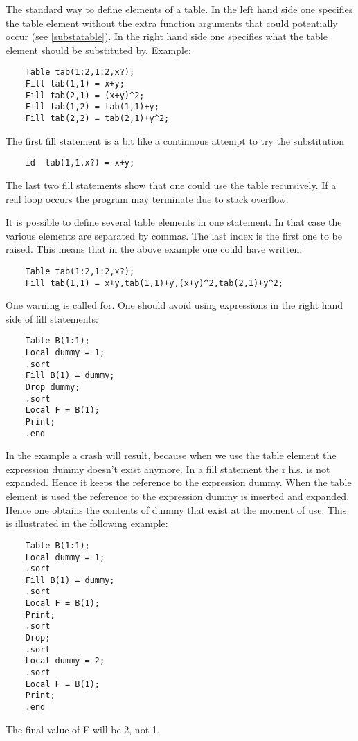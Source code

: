 \noindent The standard way to define elements of a 
table. In the left hand 
side one specifies the table element without the extra function arguments 
that could potentially occur (see \ref{substatable}). In the right hand 
side one specifies what the table element should be substituted by. 
Example:
\begin{verbatim}
    Table tab(1:2,1:2,x?);
    Fill tab(1,1) = x+y;
    Fill tab(2,1) = (x+y)^2;
    Fill tab(1,2) = tab(1,1)+y;
    Fill tab(2,2) = tab(2,1)+y^2;
\end{verbatim}
The first fill statement is a bit like a continuous attempt to try the 
substitution
\begin{verbatim}
    id  tab(1,1,x?) = x+y;
\end{verbatim}
The last two fill statements show that one could use the table 
recursively. 
If a real loop occurs the program may terminate due to
stack overflow.

\noindent It is possible to define several table elements in one statement. 
In that case the various elements are separated by commas. The last index 
is the first one to be raised. This means that in the above example one 
could have written:
\begin{verbatim}
    Table tab(1:2,1:2,x?);
    Fill tab(1,1) = x+y,tab(1,1)+y,(x+y)^2,tab(2,1)+y^2;
\end{verbatim}\vspace{10mm}

\noindent One warning is called for. One should avoid using 
expressions in the right hand side of fill statements:
\begin{verbatim}
    Table B(1:1);
    Local dummy = 1;
    .sort
    Fill B(1) = dummy;
    Drop dummy;
    .sort
    Local F = B(1);
    Print;
    .end
\end{verbatim}
In the example a crash will result, because when we use the table element 
the expression dummy doesn't exist anymore. In a fill statement the r.h.s. 
is not expanded. Hence it keeps the reference to the expression dummy. When 
the table element is used the reference to the expression dummy is inserted 
and expanded. Hence one obtains the contents of dummy that exist at the 
moment of use. This is illustrated in the following example:
\begin{verbatim}
    Table B(1:1);
    Local dummy = 1;
    .sort
    Fill B(1) = dummy;
    .sort
    Local F = B(1);
    Print;
    .sort
    Drop;
    .sort
    Local dummy = 2;
    .sort
    Local F = B(1);
    Print;
    .end
\end{verbatim}
The final value of F will be 2, not 1.

